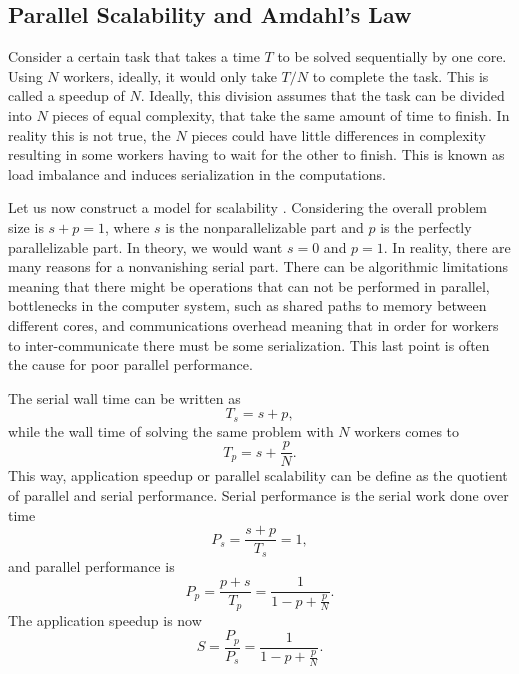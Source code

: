\subsection{Parallel Scalability and Amdahl's Law}

	Consider a certain task that takes a time $T$ to be solved sequentially by one core. Using $N$ workers, ideally, it would only take $T / N$ to complete the task. This is called a speedup of $N$. Ideally, this division assumes that the task can be divided into $N$ pieces of equal complexity, that take the same amount of time to finish. In reality this is not true, the $N$ pieces could have little differences in complexity resulting in some workers having to wait for the other to finish. This is known as load imbalance and induces serialization in the computations.
	
	Let us now construct a model for scalability \cite{Hager2011}. Considering the overall problem size is $s + p = 1$, where $s$ is the nonparallelizable part and $p$ is the perfectly parallelizable part. In theory, we would want $s=0$ and $p=1$. In reality, there are many reasons for a nonvanishing serial part. There can be algorithmic limitations meaning that there might be operations that can not be performed in parallel, bottlenecks in the computer system, such as shared paths to memory between different cores, and communications overhead meaning that in order for workers to inter-communicate there must be some serialization. This last point is often the cause for poor parallel performance. 
		
	The serial wall time can be written as
\begin{equation}
	T_s = s + p,
\end{equation}	
while the wall time of solving the same problem with $N$ workers comes to
\begin{equation}
	T_p = s + \frac{p}{N}.
\end{equation}
This way, application speedup or parallel scalability can be define as the quotient of parallel and serial performance. Serial performance is the serial work done over time
\begin{equation}
	P_s = \frac{s+p}{T_s} = 1,
\end{equation} 
and parallel performance is
\begin{equation}
	P_p = \frac{p+s}{T_p} = \frac{1}{1-p+\frac{p}{N}}.
\end{equation}
The application speedup is now
\begin{equation}\label{eq:amd_law}
	S = \frac{P_p}{P_s} = \frac{1}{1-p+\frac{p}{N}}.
\end{equation}

